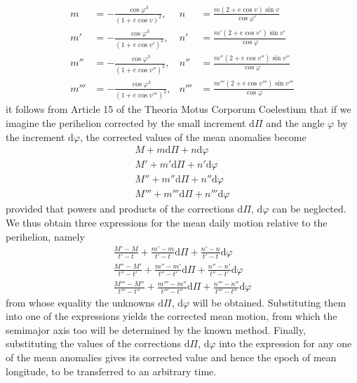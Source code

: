 \[
\begin{aligned}
m&=-\frac{\cos\varphi^3}{(1+e\cos v)^2},&n&=\frac{m(2+e\cos v)\sin v}{\cos\varphi'}\\[6pt]
m'&=-\frac{\cos\varphi^3}{(1+e\cos v')^2},&n'&=\frac{m'(2+e\cos v')\sin v'}{\cos\varphi}\\[6pt]
m''&=-\frac{\cos\varphi^3}{(1+e\cos v'')^2},&n''&=\frac{m''(2+e\cos v'')\sin v''}{\cos\varphi}\\[6pt]
m'''&=-\frac{\cos\varphi^3}{(1+e\cos v''')^2},&n'''&=\frac{m'''(2+e\cos v''')\sin v'''}{\cos\varphi}
\end{aligned}
\]
\noindent{}
it follows from Article 15 of the Theoria Motus Corporum Coelestium that if we imagine the perihelion corrected by the small increment $\mathrm d\Pi$ and the angle $\varphi$ by the increment $\mathrm d\varphi$, the corrected values of the mean anomalies become
\[
\begin{gathered}
M+m\mathrm d\Pi+n\mathrm d\varphi\\
M'+m'\mathrm d\Pi+n'\mathrm d\varphi\\
M''+m''\mathrm d\Pi+n''\mathrm d\varphi\\
M'''+m'''\mathrm d\Pi+n'''\mathrm d\varphi
\end{gathered}
\]
provided that powers and products of the corrections $\mathrm d\Pi$, $\mathrm d\varphi$ can be neglected. We thus obtain three expressions for the mean daily motion relative to the perihelion, namely
\[
\begin{gathered}
\frac{M'-M}{t'-t}+\frac{m'-m}{t'-t}\mathrm d\Pi+\frac{n'-n}{t'-t}\mathrm d\varphi\\[5pt]
\frac{M''-M'}{t''-t'}+\frac{m''-m'}{t''-t'}\mathrm d\Pi+\frac{n''-n'}{t''-t'}\mathrm d\varphi\\[5pt]
\frac{M'''-M''}{t'''-t''}+\frac{m'''-m''}{t'''-t''}\mathrm d\Pi+\frac{n'''-n''}{t'''-t''}\mathrm d\varphi
\end{gathered}
\]
from whose equality the unknowns $\mathrm d\Pi$, $\mathrm d\varphi$ will be obtained. Substituting them into one of the expressions yields the corrected mean motion, from which the semimajor axis too will be determined by the known method. Finally, substituting the values of the corrections $\mathrm d\Pi$, $\mathrm d\varphi$ into the expression for any one of the mean anomalies gives its corrected value and hence the epoch of mean longitude, to be transferred to an arbitrary time.

